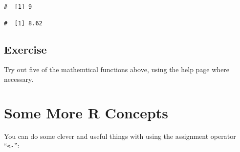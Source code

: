 \documentclass[a4paper,9pt,twocolumn,twoside,printwatermark=false]{pinp}
\begin{document}
\begin{Shaded}
\begin{Highlighting}[]
\NormalTok{(}\NormalTok{)}
\end{Highlighting}
\end{Shaded}

\begin{ShadedResult}
\begin{verbatim}
#  [1] 9
\end{verbatim}
\end{ShadedResult}

\begin{Shaded}
\begin{Highlighting}[]
\NormalTok{(}\NormalTok{, }\NormalTok{)}
\end{Highlighting}
\end{Shaded}

\begin{ShadedResult}
\begin{verbatim}
#  [1] 8.62
\end{verbatim}
\end{ShadedResult}

\subsection{Exercise}\label{exercise-1}

Try out five of the mathemtical functions above, using the help page
where necessary.

\section{Some More R Concepts}\label{some-more-r-concepts}

You can do some clever and useful things with using the assignment
operator ``\texttt{\textless{}-}'':

\begin{Shaded}
\begin{Highlighting}[]
\StringTok{ }
\StringTok{ }
\StringTok{ }\OperatorTok{*}\StringTok{ }
\end{Highlighting}
\end{Shaded}
\end{document}
